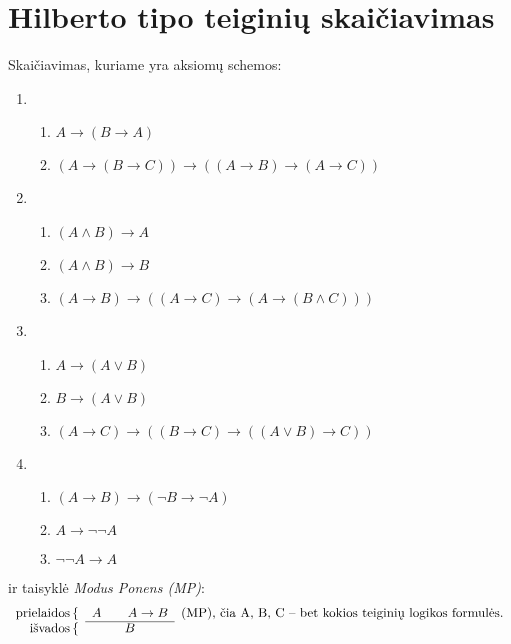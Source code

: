 \chapter{Hilberto tipo teiginių skaičiavimas}

\begin{defn}
  Skaičiavimas, kuriame yra aksiomų schemos:
  \renewcommand{\theenumii}{\arabic{enumii}}
  \renewcommand{\labelenumii}{\theenumii}
  \begin{enumerate}
    \item%
      \begin{enumerate}
        \item $A \to (B \to A)$
        \item $(A \to (B \to C)) \to ((A \to B) \to (A \to C))$
      \end{enumerate}
    \item%
      \begin{enumerate}
        \item $(A \land B) \to A$
        \item $(A \land B) \to B$
        \item $(A \to B) \to ((A \to C) \to (A \to (B \land C)))$
      \end{enumerate}
    \item%
      \begin{enumerate}
        \item $A \to (A \lor B)$
        \item $B \to (A \lor B)$
        \item $(A \to C) \to ((B \to C) \to ((A \lor B) \to C))$
      \end{enumerate}
    \item%
      \begin{enumerate}
        \item $(A \to B) \to (\neg B \to \neg A)$
        \item $A \to \neg\neg A$
        \item $\neg\neg A \to A$
      \end{enumerate}
  \end{enumerate}
  ir taisyklė \emph{Modus Ponens (MP)}:
  \[
  \begin{array}{r c l}
    \text{prielaidos} \,\{ & A \qquad A \to B & %
      \text{(MP), čia A, B, C – bet kokios teiginių logikos formulės.} \\
    \cline{2-2}
    \text{išvados} \,\{ & B &
  \end{array}
  \]

\end{defn}

